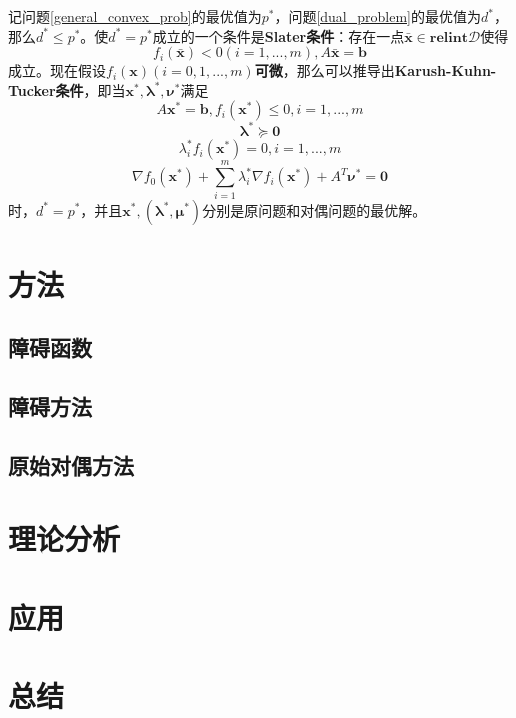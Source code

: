 \documentclass{article}
\begin{document}
记问题\ref{general_convex_prob}的最优值为$p^*$，问题\ref{dual_problem}的最优值为$d^*$，
那么$d^*\le p^*$。使$d^*=p^*$成立的一个条件是\textbf{Slater条件}：存在一点$\bar{\bm x}\in \textbf{relint}\mathcal D$使得
$$f_i(\bar{\bm x})<0(i=1,...,m),A\bar{\bm x}=\bm b$$
成立。现在假设$f_i(\bm x)(i=0,1,...,m)$\textbf{可微}，那么可以推导出\textbf{Karush-Kuhn-Tucker条件}，即当$\bm x^*,\bm\lambda^*,\bm\nu^*$满足
$$A\bm x^*=\bm b,f_i(\bm x^*)\le 0,i=1,...,m$$
$$\bm\lambda^*\succeq \bm 0$$
$$\lambda^*_if_i(\bm x^*)=0,i=1,...,m$$
$$\nabla f_0(\bm x^*)+\sum_{i=1}^m{\lambda^*_i}\nabla f_i(\bm x^*)+A^T\bm\nu^*=\bm 0$$
时，$d^*=p^*$，并且$\bm x^*,(\bm\lambda^*,\bm\mu^*)$分别是原问题和对偶问题的最优解。
\section{方法}
\subsection{障碍函数}
\subsection{障碍方法}
\subsection{原始对偶方法}
\section{理论分析}
\section{应用}
\section{总结}
\end{document}
